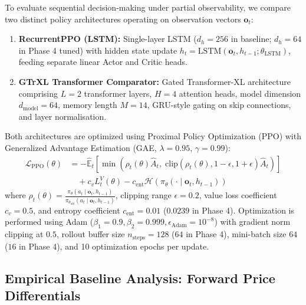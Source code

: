 To evaluate sequential decision-making under partial observability, we compare two distinct policy architectures operating on observation vectors $\mathbf{o}_t$:
\begin{enumerate}
    \item \textbf{RecurrentPPO (LSTM):} Single-layer LSTM ($d_h = 256$ in baseline; $d_h = 64$ in Phase 4 tuned) \cite{hochreiter1997lstm, pleines2022recurrentppo} with hidden state update $h_t = \mathrm{LSTM}(\mathbf{o}_t, h_{t-1}; \theta_{\text{LSTM}})$, feeding separate linear Actor and Critic heads.
    \item \textbf{GTrXL Transformer Comparator:} Gated Transformer-XL architecture \cite{parisotto2020gtrxl, vaswani2017attention} comprising $L = 2$ transformer layers, $H = 4$ attention heads, model dimension $d_{\text{model}} = 64$, memory length $M = 14$, GRU-style gating on skip connections, and layer normalisation.
\end{enumerate}
Both architectures are optimized using Proximal Policy Optimization (PPO) \cite{schulman2017ppo} with Generalized Advantage Estimation (GAE, $\lambda = 0.95$, $\gamma = 0.99$):
\begin{equation}
\begin{aligned}
    \mathcal{L}_{\text{PPO}}(\theta) &= -\hat{\mathbb{E}}_t \left[ \min\left( \rho_t(\theta) \hat{A}_t,\; \mathrm{clip}(\rho_t(\theta), 1-\epsilon, 1+\epsilon) \hat{A}_t \right) \right] \\
    &\quad + c_v L_t^V(\theta) - c_{\text{ent}} \mathcal{H}(\pi_\theta(\cdot \mid \mathbf{o}_t, h_{t-1}))
\end{aligned}
\label{eq:ppo_loss}
\end{equation}
where $\rho_t(\theta) = \frac{\pi_\theta(a_t \mid \mathbf{o}_t, h_{t-1})}{\pi_{\theta_{\text{old}}}(a_t \mid \mathbf{o}_t, h_{t-1})}$, clipping range $\epsilon = 0.2$, value loss coefficient $c_v = 0.5$, and entropy coefficient $c_{\text{ent}} = 0.01$ ($0.0239$ in Phase 4). Optimization is performed using Adam ($\beta_1 = 0.9, \beta_2 = 0.999, \epsilon_{\text{Adam}} = 10^{-8}$) with gradient norm clipping at $0.5$, rollout buffer size $n_{\text{steps}} = 128$ ($64$ in Phase 4), mini-batch size $64$ ($16$ in Phase 4), and 10 optimization epochs per update.

\subsection{Empirical Baseline Analysis: Forward Price Differentials}
\label{subsec:d2_anomaly}

